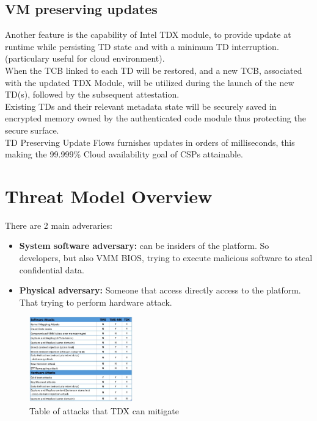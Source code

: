 \subsection{VM preserving updates}
Another feature is the capability of Intel TDX module, to provide update at runtime while persisting TD state and with a minimum TD interruption. (particulary useful for cloud environment). \\
When the TCB linked to each TD will be restored, and a new TCB, associated with the updated TDX Module, will be utilized during the launch of the new TD(s), followed by the subsequent attestation. \\
Existing TDs and their relevant metadata state will be securely saved in encrypted memory owned by the authenticated code module thus protecting the secure surface. \\
TD Preserving Update Flows furnishes updates in orders of milliseconds, this making the 99.999\% Cloud availability goal of CSPs attainable. \\


\section{Threat Model Overview}
There are 2 main adveraries:
\begin{itemize}
    \item \textbf{System software adversary:}  can be insiders of the platform. So developers, but also VMM BIOS, trying to execute malicious software to steal confidential data.
    \item \textbf{Physical adversary:} Someone that access directly access to the platform. That trying to perform hardware attack.
\end{itemize}

\begin{figure}[H]
    \centering
    \includegraphics[width=0.4\textwidth]{img/tdx attacks table.png}
    \caption{Table of attacks that TDX can mitigate}
    \label{fig:tdx attacks table}
\end{figure}